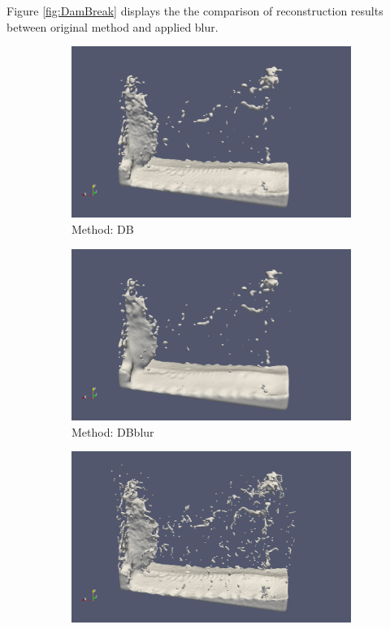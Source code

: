 Figure \ref{fig:DamBreak} displays the  the comparison of reconstruction results between original method and applied blur.
\begin{figure}[h]
	\begin{center}
        \begin{subfigure}[b]{0.4\textwidth}
               \includegraphics[width=\textwidth]{figures/ReconstructionDencityBased.png}
				\caption{Method: DB}
        \end{subfigure}
        \begin{subfigure}[b]{0.4\textwidth}
               \includegraphics[width=\textwidth]{figures/ReconstructionDencityBasedBlur.png}
				\caption{Method: DBblur}
        \end{subfigure}
        \begin{subfigure}[b]{0.4\textwidth}
               \includegraphics[width=\textwidth]{figures/ReconstructionZhuBridson.png}

\end{subfigure}
\end{center}
\end{figure}
